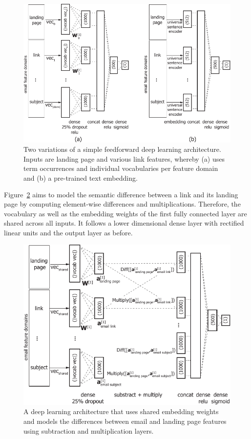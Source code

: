 \documentclass{sigchi}
\begin{document}
\begin{figure}[t]
	\centering
	\includegraphics[width=1.0\columnwidth]{figures/model_0_4_1_and_6.pdf}
	\caption{Two variations of a simple feedforward deep learning architecture. Inputs are landing page and various link features, whereby (a) uses term occurrences and individual vocabularies per feature domain and (b) a pre-trained text embedding.} %
	\label{fig:model_a_b}
\end{figure}

Figure~\ref{fig:model_c} aims to model the semantic difference between a link and its landing page by computing element-wise differences and multiplications. Therefore, the vocabulary as well as the embedding weights of the first fully connected layer are shared across all inputs. It follows a lower dimensional dense layer with rectified linear units and the output layer as before.

\begin{figure}[t]
	\centering
	\includegraphics[width=1.0\columnwidth]{figures/model_0_6.pdf}
	\caption{A deep learning architecture that uses shared embedding weights and models the differences between email and landing page features using subtraction and multiplication layers.}
	\label{fig:model_c}
\end{figure}
\end{document}
